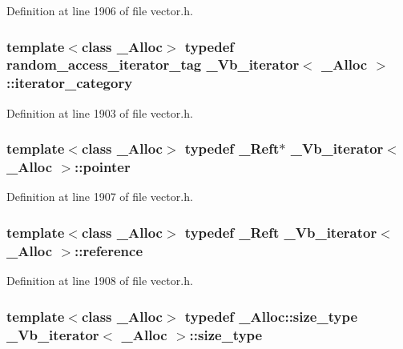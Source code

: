 Definition at line 1906 of file vector.\+h.

\hypertarget{class___vb__iterator_a637be1a0886bd658f935ce022e5bfe09}{
\subsubsection[{iterator\+\_\+category}]{\setlength{\rightskip}{0pt plus 5cm}template$<$class \+\_\+\+Alloc$>$ typedef random\+\_\+access\+\_\+iterator\+\_\+tag {\bf \+\_\+\+Vb\+\_\+iterator}$<$ \+\_\+\+Alloc $>$\+::{\bf iterator\+\_\+category}}}\label{class___vb__iterator_a637be1a0886bd658f935ce022e5bfe09}


Definition at line 1903 of file vector.\+h.

\hypertarget{class___vb__iterator_abfdae002074201202d96a0200ca2ab23}{
\subsubsection[{pointer}]{\setlength{\rightskip}{0pt plus 5cm}template$<$class \+\_\+\+Alloc$>$ typedef {\bf \+\_\+\+Reft}$\ast$ {\bf \+\_\+\+Vb\+\_\+iterator}$<$ \+\_\+\+Alloc $>$\+::{\bf pointer}}}\label{class___vb__iterator_abfdae002074201202d96a0200ca2ab23}


Definition at line 1907 of file vector.\+h.

\hypertarget{class___vb__iterator_a0fd0a2449dbc621f22117b1999cb1929}{
\subsubsection[{reference}]{\setlength{\rightskip}{0pt plus 5cm}template$<$class \+\_\+\+Alloc$>$ typedef {\bf \+\_\+\+Reft} {\bf \+\_\+\+Vb\+\_\+iterator}$<$ \+\_\+\+Alloc $>$\+::{\bf reference}}}\label{class___vb__iterator_a0fd0a2449dbc621f22117b1999cb1929}


Definition at line 1908 of file vector.\+h.

\hypertarget{class___vb__iterator_a9dfed016c4d7f08f4bac304af81f8397}{
\subsubsection[{size\+\_\+type}]{\setlength{\rightskip}{0pt plus 5cm}template$<$class \+\_\+\+Alloc$>$ typedef \+\_\+\+Alloc\+::size\+\_\+type {\bf \+\_\+\+Vb\+\_\+iterator}$<$ \+\_\+\+Alloc $>$\+::{\bf size\+\_\+type}}}\label{class___vb__iterator_a9dfed016c4d7f08f4bac304af81f8397}


